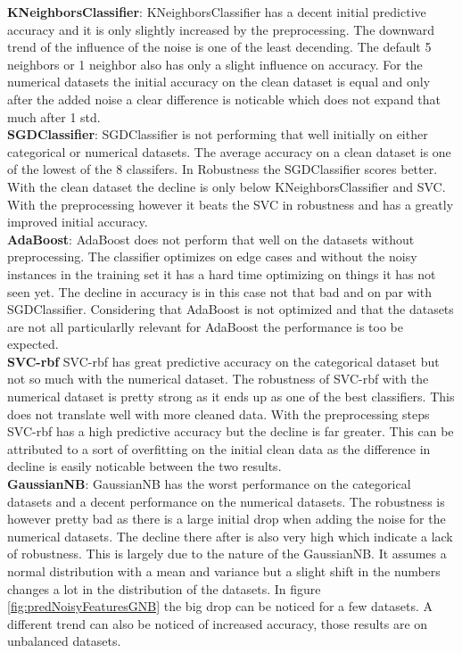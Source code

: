 \documentclass[a4paper,10pt]{article}
\begin{document}
\textbf{KNeighborsClassifier}: KNeighborsClassifier has a decent initial predictive accuracy and it is only slightly increased by the preprocessing. The downward trend of the influence of the noise is one of the least decending. The default 5 neighbors or 1 neighbor also has only a slight influence on accuracy. For the numerical datasets the initial accuracy on the clean dataset is equal and only after the added noise a clear difference is noticable which does not expand that much after 1 std.\\

\textbf{SGDClassifier}: SGDClassifier is not performing that well initially on either categorical or numerical datasets. The average accuracy on a clean dataset is one of the lowest of the 8 classifers. In Robustness the SGDClassifier scores better. With the clean dataset the decline is only below KNeighborsClassifier and SVC. With the preprocessing however it beats the SVC in robustness and has a greatly improved initial accuracy. \\

\textbf{AdaBoost}: AdaBoost does not perform that well on the datasets without preprocessing. The classifier optimizes on edge cases and without the noisy instances in the training set it has a hard time optimizing on things it has not seen yet. The decline in accuracy is in this case not that bad and on par with SGDClassifier. Considering that AdaBoost is not optimized and that the datasets are not all particularlly relevant for AdaBoost the performance is too be expected.\\

\textbf{SVC-rbf} SVC-rbf has great predictive accuracy on the categorical dataset but not so much with the numerical dataset. The robustness of SVC-rbf with the numerical dataset is pretty strong as it ends up as one of the best classifiers. This does not translate well with more cleaned data. With the preprocessing steps SVC-rbf has a high predictive accuracy but the decline is far greater. This can be attributed to a sort of overfitting on the initial clean data as the difference in decline is easily noticable between the two results. \\

\textbf{GaussianNB}: GaussianNB has the worst performance on the categorical datasets and a decent performance on the numerical datasets. The robustness is however pretty bad as there is a large initial drop when adding the noise for the numerical datasets. The decline there after is also very high which indicate a lack of robustness. This is largely due to the nature of the GaussianNB. It assumes a normal distribution with a mean and variance but a slight shift in the numbers changes a lot in the distribution of the datasets. In figure \ref{fig:predNoisyFeaturesGNB} the big drop can be noticed for a few datasets. A different trend can also be noticed of increased accuracy, those results are on unbalanced datasets. \\
\end{document}
